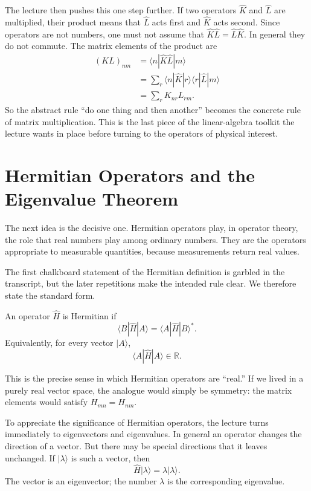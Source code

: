The lecture then pushes this one step further. If two operators \(\hat K\) and \(\hat L\) are multiplied, their product means that \(\hat L\) acts first and \(\hat K\) acts second. Since operators are not numbers, one must not assume that \(\hat K\hat L=\hat L\hat K\). In general they do not commute. The matrix elements of the product are
\begin{align}
(KL)_{nm}
&=
\langle n|\hat K\hat L|m\rangle \\
&=
\sum_r \langle n|\hat K|r\rangle \langle r|\hat L|m\rangle \\
&=
\sum_r K_{nr}L_{rm}.
\end{align}
So the abstract rule ``do one thing and then another'' becomes the concrete rule of matrix multiplication. This is the last piece of the linear-algebra toolkit the lecture wants in place before turning to the operators of physical interest.

\section{Hermitian Operators and the Eigenvalue Theorem}

The next idea is the decisive one. Hermitian operators play, in operator theory, the role that real numbers play among ordinary numbers. They are the operators appropriate to measurable quantities, because measurements return real values.

The first chalkboard statement of the Hermitian definition is garbled in the transcript, but the later repetitions make the intended rule clear. We therefore state the standard form.

\begin{definition}
An operator \(\hat H\) is Hermitian if
\begin{equation}
\langle B|\hat H|A\rangle=\langle A|\hat H|B\rangle^*.
\end{equation}
Equivalently, for every vector \(|A\rangle\),
\begin{equation}
\langle A|\hat H|A\rangle\in\mathbb R.
\end{equation}
\end{definition}

This is the precise sense in which Hermitian operators are ``real.'' If we lived in a purely real vector space, the analogue would simply be symmetry: the matrix elements would satisfy \(H_{mn}=H_{nm}\).

To appreciate the significance of Hermitian operators, the lecture turns immediately to eigenvectors and eigenvalues. In general an operator changes the direction of a vector. But there may be special directions that it leaves unchanged. If \(|\lambda\rangle\) is such a vector, then
\begin{equation}
\hat H|\lambda\rangle=\lambda|\lambda\rangle.
\end{equation}
The vector is an eigenvector; the number \(\lambda\) is the corresponding eigenvalue.

